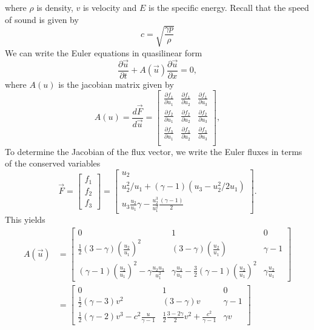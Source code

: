 where $\rho$ is density, $v$ is velocity and $E$ is the specific energy. Recall that the speed of sound is given by
\begin{equation}
	c = \sqrt{\frac{\gamma p}{\rho}}
\end{equation}
We can write the Euler equations in quasilinear form 
\begin{equation}
	\frac{\partial \vec u}{\partial t} + A(\vec u) \frac{\partial \vec u}{\partial x} = 0,
\end{equation}
where $A(u)$ is the jacobian matrix given by
\begin{equation}
	A(u) = \frac{d\vec F}{d \vec u} =
	\begin{bmatrix}
	\frac{\partial f_1}{\partial u_1} & \frac{\partial f_1}{\partial u_2} & \frac{\partial f_1}{\partial u_3} \\
	\frac{\partial f_2}{\partial u_1} & \frac{\partial f_2}{\partial u_2} & \frac{\partial f_2}{\partial u_3} \\
	\frac{\partial f_3}{\partial u_1} & \frac{\partial f_3}{\partial u_2} & \frac{\partial f_3}{\partial u_3} \\
	\end{bmatrix},
\end{equation}
To determine the Jacobian of the flux vector, we write the Euler fluxes in terms of the conserved variables
\begin{equation}
	\vec F = 
	\begin{bmatrix}
		f_1 \\ f_2 \\ f_3
	\end{bmatrix}
	= 
	\begin{bmatrix}
		u_2 \\ u_2^2/u_1 + (\gamma-1)(u_3-u_2^2/2 u_1) \\ u_3 \frac{u_2}{u_1} \gamma - \frac{u_2^3}{u_1^2}\frac{(\gamma-1)}{2} 
	\end{bmatrix}.
\end{equation}
This yields 
\begin{align}
	A(\vec u) &= 
	\begin{bmatrix}
		0 & 1 & 0 \\
		\frac{1}{2}(3-\gamma)\left(\frac{u_2}{u_1}\right)^2 & (3-\gamma)\left(\frac{u_2}{u_1}\right) & \gamma-1 \\
		(\gamma-1) \left(\frac{u_2}{u_1}\right)^2 - \gamma \frac{u_2 u_3}{u_1^2} & \gamma \frac{u_3}{u_1}-\frac{3}{2}(\gamma-1)\left(\frac{u_2}{u_1}\right)^2 & \gamma \frac{u_2}{u_1}
	\end{bmatrix}\\
	&= 
	\begin{bmatrix}
		0 & 1 & 0 \\
		\frac{1}{2} (\gamma-3)v^2 & (3-\gamma)v & \gamma-1 \\ 
		\frac{1}{2} (\gamma-2) v^3 - c^2 \frac{u}{\gamma-1} & \frac{1}{2}\frac{3-2\gamma}{2}v^2 + \frac{c^2}{\gamma-1} & \gamma v
	\end{bmatrix}
	\label{eq:eulerjacobian}
\end{align}

